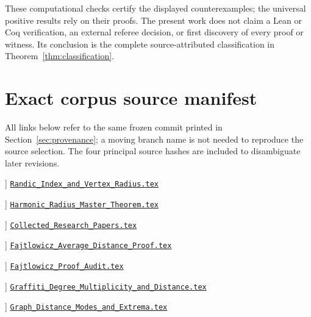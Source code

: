 \documentclass[11pt,a4paper]{article}
\theoremstyle{remark}\newtheorem{remark}[theorem]{Remark}
\begin{document}
These computational checks certify the displayed counterexamples; the
universal positive results rely on their proofs. The present work does not
claim a Lean or Coq verification, an external referee decision, or first
discovery of every proof or witness. Its conclusion is the complete
source-attributed classification in Theorem~\ref{thm:classification}.

\clearpage
\appendix
\section{Exact corpus source manifest}\label{app:manifest}
All links below refer to the same frozen commit printed in
Section~\ref{sec:provenance}; a moving branch name is not needed to reproduce
the source selection. The four principal source hashes are included to
disambiguate later revisions.
\begin{description}[font=\normalfont\bfseries]
\item[[161]] \href{https://github.com/QEEDDD/Verifiable-Mathematical-Reasoning-Corpus/blob/52c1e4ae1f82bd3fdc8b809b9a94e2e4c6ef4cb3/\%5B161\%5D\%20Randic\_Index\_and\_Vertex\_Radius.tex}{\nolinkurl{Randic_Index_and_Vertex_Radius.tex}}
\item[[171]] \href{https://github.com/QEEDDD/Verifiable-Mathematical-Reasoning-Corpus/blob/52c1e4ae1f82bd3fdc8b809b9a94e2e4c6ef4cb3/\%5B171\%5D\%20Harmonic\_Radius\_Master\_Theorem.tex}{\nolinkurl{Harmonic_Radius_Master_Theorem.tex}}
\item[[189]] \href{https://github.com/QEEDDD/Verifiable-Mathematical-Reasoning-Corpus/blob/52c1e4ae1f82bd3fdc8b809b9a94e2e4c6ef4cb3/\%5B189\%5D\%20Collected\_Research\_Papers.tex}{\nolinkurl{Collected_Research_Papers.tex}}
\item[[226]] \href{https://github.com/QEEDDD/Verifiable-Mathematical-Reasoning-Corpus/blob/52c1e4ae1f82bd3fdc8b809b9a94e2e4c6ef4cb3/\%5B226\%5D\%20Fajtlowicz\_Average\_Distance\_Proof.tex}{\nolinkurl{Fajtlowicz_Average_Distance_Proof.tex}}
\item[[227]] \href{https://github.com/QEEDDD/Verifiable-Mathematical-Reasoning-Corpus/blob/52c1e4ae1f82bd3fdc8b809b9a94e2e4c6ef4cb3/\%5B227\%5D\%20Fajtlowicz\_Proof\_Audit.tex}{\nolinkurl{Fajtlowicz_Proof_Audit.tex}}
\item[[243]] \href{https://github.com/QEEDDD/Verifiable-Mathematical-Reasoning-Corpus/blob/52c1e4ae1f82bd3fdc8b809b9a94e2e4c6ef4cb3/\%5B243\%5D\%20Graffiti\_Degree\_Multiplicity\_and\_Distance.tex}{\nolinkurl{Graffiti_Degree_Multiplicity_and_Distance.tex}}
\item[[244]] \href{https://github.com/QEEDDD/Verifiable-Mathematical-Reasoning-Corpus/blob/52c1e4ae1f82bd3fdc8b809b9a94e2e4c6ef4cb3/\%5B244\%5D\%20Graph\_Distance\_Modes\_and\_Extrema.tex}{\nolinkurl{Graph_Distance_Modes_and_Extrema.tex}}
\end{description}
\end{document}
